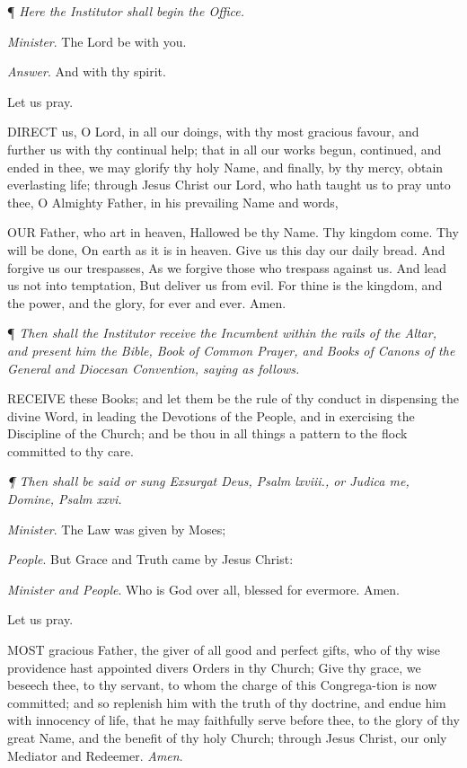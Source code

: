 ¶
\emph{Here the Institutor shall begin the Office.}

\emph{Minister}.
The Lord be with you.

\emph{Answer}. And with thy spirit.

Let us pray.

DIRECT us, O Lord, in all
our doings, with thy most gracious favour, and further us with thy continual
help; that in all our works begun, continued, and ended in thee, we may
glorify thy holy Name, and finally, by thy mercy, obtain everlasting life;
through Jesus Christ our Lord, who hath taught us to pray unto thee, O
Almighty Father, in his prevailing Name and words,

OUR Father, who art in
heaven, Hallowed be thy Name. Thy kingdom come. Thy will be done, On earth
as it is in heaven. Give us this day our daily bread. And forgive us our
trespasses, As we forgive those who trespass against us. And lead us not
into temptation, But deliver us from evil. For thine is the kingdom, and
the power, and the glory, for ever and ever. Amen.

¶ \emph{Then shall the
Institutor receive the Incumbent within the rails of the Altar, and present
him the Bible, Book of Common Prayer, and Books of Canons of the General
and Diocesan Convention, saying as follows.}

RECEIVE these Books; and
let them be the rule of thy conduct in dispensing the divine Word, in
leading the Devotions of the People, and in exercising the Discipline
of the Church; and be thou in all things a pattern to the flock committed
to thy care.

\emph{¶ Then shall be said or sung Exsurgat
Deus, Psalm lxviii., or Judica me, Domine, Psalm xxvi.}

\emph{Minister}. The Law was given
by Moses;

\emph{People}. But Grace and Truth came by Jesus
Christ:

\emph{Minister and People}. Who is God over all,
blessed for evermore. Amen.

Let us pray.

MOST gracious Father,
the giver of all good and perfect gifts, who of thy wise providence hast
appointed divers Orders in thy Church; Give thy grace, we beseech thee,
to thy servant, to whom the charge of this Congrega-tion is now committed;
and so replenish him with the truth of thy doctrine, and endue him with
innocency of life, that he may faithfully serve before thee, to the glory
of thy great Name, and the benefit of thy holy Church; through Jesus Christ,
our only Mediator and Redeemer. \emph{Amen}.

